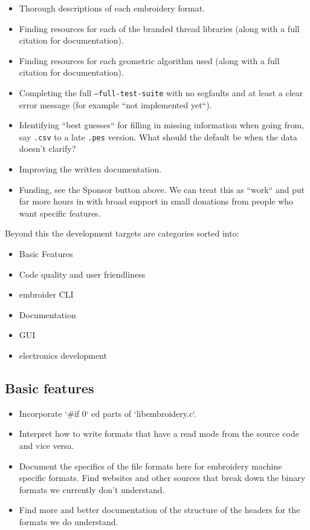 \documentclass[11pt]{report}
\begin{document}
\begin{itemize}
\item Thorough descriptions of each embroidery format.
\item Finding resources for each of the branded thread libraries (along with a
  full citation for documentation).
\item Finding resources for each geometric algorithm used (along with a full
  citation for documentation).
\item Completing the full \texttt{--full-test-suite} with no segfaults and at least a
  clear error message (for example ``not implemented yet``).
\item Identifying ``best guesses`` for filling in missing information when going
  from, say \texttt{.csv} to a late \texttt{.pes} version. What should the default be when
  the data doesn't clarify?
\item Improving the written documentation.
\item Funding, see the Sponsor button above. We can treat this as ``work`` and
  put far more hours in with broad support in small donations from people who want
  specific features.
\end{itemize}

Beyond this the development targets are categories sorted into:

\begin{itemize}
\item Basic Features
\item Code quality and user friendliness
\item embroider CLI
\item Documentation
\item GUI
\item electronics development
\end{itemize}

\subsection{Basic features}

\begin{itemize}
\item Incorporate `\#if 0` ed parts of `libembroidery.c`.
\item Interpret how to write formats that have a read mode from the source
code and vice versa.
\item Document the specifics of the file formats here for embroidery machine
specific formats. Find websites and other sources that break down the binary
formats we currently don't understand.
\item Find more and better documentation of the structure of the headers for the
formats we do understand.
\end{itemize}
\end{document}
